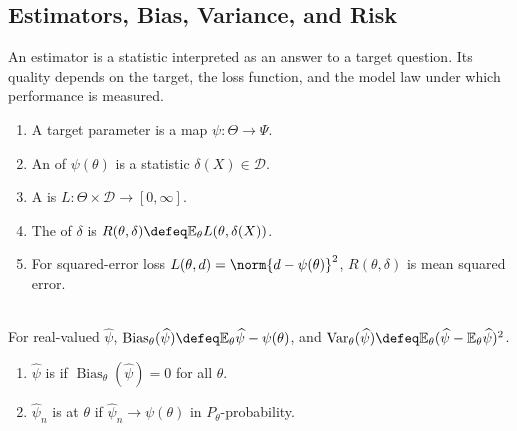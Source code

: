 \subsection{Estimators, Bias, Variance, and Risk}

An estimator is a statistic interpreted as an answer to a target question.  Its quality depends on the target, the loss function, and the model law under which performance is measured.

\begin{definition} \label{def:estimator-loss-risk} 
\begin{enumerate}[label=(\roman*)]
\setlength{\itemsep}{0pt}
\item A target parameter is a map $\psi:\Theta\to\Psi$.
\item An  of $\psi(\theta)$ is a statistic $\delta(X)\in\mathcal{D}$.
\item A  is $L:\Theta\times\mathcal{D}\to[0,\infty]$.
\item The  of $\delta$ is $R(\theta,\delta)\defeq\mathbb{E}_\theta L(\theta,\delta(X))$.
\item For squared-error loss $L(\theta,d)=\norm{d-\psi(\theta)}^2$, $R(\theta,\delta)$ is mean squared error.
\end{enumerate}
\end{definition}

\begin{definition} \label{def:bias-variance-consistency} \\
For real-valued $\widehat{\psi}$, $\operatorname{Bias}_\theta(\widehat{\psi})\defeq\mathbb{E}_\theta\widehat{\psi}-\psi(\theta)$, and $\operatorname{Var}_\theta(\widehat{\psi})\defeq\mathbb{E}_\theta(\widehat{\psi}-\mathbb{E}_\theta\widehat{\psi})^2$.
\begin{enumerate}[label=(\roman*)]
\setlength{\itemsep}{0pt}
\item $\widehat{\psi}$ is  if $\operatorname{Bias}_\theta(\widehat{\psi})=0$ for all $\theta$.
\item $\widehat{\psi}_n$ is  at $\theta$ if $\widehat{\psi}_n\to\psi(\theta)$ in $P_\theta$-probability.
\end{enumerate}
\end{definition}

